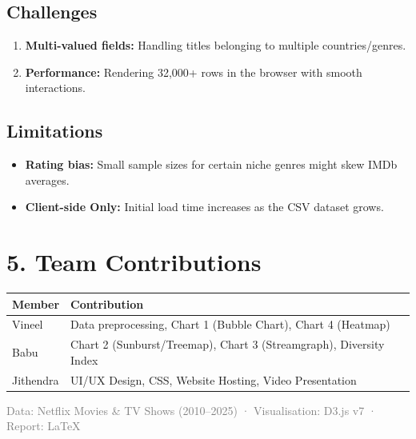 \documentclass[11pt,a4paper]{article}
\begin{document}
\subsection{Challenges}
\begin{enumerate}[nosep]
  \item \textbf{Multi-valued fields:} Handling titles belonging to multiple countries/genres.
  \item \textbf{Performance:} Rendering 32,000+ rows in the browser with smooth interactions.
\end{enumerate}

\subsection{Limitations}
\begin{itemize}[nosep]
  \item \textbf{Rating bias:} Small sample sizes for certain niche genres might skew IMDb averages.
  \item \textbf{Client-side Only:} Initial load time increases as the CSV dataset grows.
\end{itemize}

\section{5. Team Contributions}

\begin{table}[H]
\centering
\begin{tabular}{@{}lp{10cm}@{}}
\toprule
\textbf{Member} & \textbf{Contribution} \\
\midrule
Vineel & Data preprocessing, Chart 1 (Bubble Chart), Chart 4 (Heatmap) \\
Babu & Chart 2 (Sunburst/Treemap), Chart 3 (Streamgraph), Diversity Index \\
Jithendra & UI/UX Design, CSS, Website Hosting, Video Presentation \\
\bottomrule
\end{tabular}
\end{table}

\vfill
\begin{center}
\small\textcolor{gray}{Data: Netflix Movies \& TV Shows (2010–2025) · Visualisation: D3.js v7 · Report: \LaTeX}
\end{center}
\end{document}
